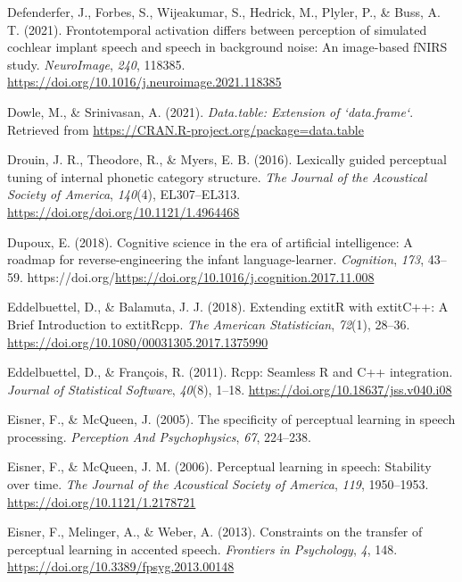 \documentclass[
  11pt,
  english,
  man,floatsintext]{apa6}
\newlength{\cslhangindent}
\newlength{\cslentryspacingunit} %
\newenvironment{CSLReferences}[2] %
 {%
  \setlength{\parindent}{0pt}
  \ifodd #1
  \let\oldpar\par
  \def\par{\hangindent=\cslhangindent\oldpar}
  \fi
  \setlength{\parskip}{#2\cslentryspacingunit}
 }%
 {}
\begin{document}
\begin{CSLReferences}{1}{0}
\leavevmode{}%
Defenderfer, J., Forbes, S., Wijeakumar, S., Hedrick, M., Plyler, P., \& Buss, A. T. (2021). Frontotemporal activation differs between perception of simulated cochlear implant speech and speech in background noise: An image-based fNIRS study. \emph{NeuroImage}, \emph{240}, 118385. \url{https://doi.org/10.1016/j.neuroimage.2021.118385}

\leavevmode{}%
Dowle, M., \& Srinivasan, A. (2021). \emph{Data.table: Extension of `data.frame`}. Retrieved from \url{https://CRAN.R-project.org/package=data.table}

\leavevmode{}%
Drouin, J. R., Theodore, R., \& Myers, E. B. (2016). Lexically guided perceptual tuning of internal phonetic category structure. \emph{The Journal of the Acoustical Society of America}, \emph{140}(4), EL307--EL313. \url{https://doi.org/doi.org/10.1121/1.4964468}

\leavevmode{}%
Dupoux, E. (2018). Cognitive science in the era of artificial intelligence: A roadmap for reverse-engineering the infant language-learner. \emph{Cognition}, \emph{173}, 43--59. https://doi.org/\url{https://doi.org/10.1016/j.cognition.2017.11.008}

\leavevmode{}%
Eddelbuettel, D., \& Balamuta, J. J. (2018). {Extending extit{R} with extit{C++}: A Brief Introduction to extit{Rcpp}}. \emph{The American Statistician}, \emph{72}(1), 28--36. \url{https://doi.org/10.1080/00031305.2017.1375990}

\leavevmode{}%
Eddelbuettel, D., \& François, R. (2011). {Rcpp}: Seamless {R} and {C++} integration. \emph{Journal of Statistical Software}, \emph{40}(8), 1--18. \url{https://doi.org/10.18637/jss.v040.i08}

\leavevmode{}%
Eisner, F., \& McQueen, J. (2005). The specificity of perceptual learning in speech processing. \emph{Perception And Psychophysics}, \emph{67}, 224--238.

\leavevmode{}%
Eisner, F., \& McQueen, J. M. (2006). Perceptual learning in speech: Stability over time. \emph{The Journal of the Acoustical Society of America}, \emph{119}, 1950--1953. \url{https://doi.org/10.1121/1.2178721}

\leavevmode{}%
Eisner, F., Melinger, A., \& Weber, A. (2013). Constraints on the transfer of perceptual learning in accented speech. \emph{Frontiers in Psychology}, \emph{4}, 148. \url{https://doi.org/10.3389/fpsyg.2013.00148}


\end{CSLReferences}
\end{document}
